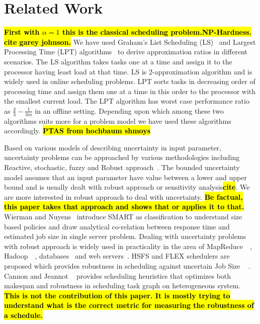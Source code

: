 \documentclass[10pt, conference, compsocconf]{IEEEtran}
\newcommand{\todo}[1]{{\color{red}\textbf{\hl{#1}}\xspace}}
\begin{document}
\section{Related Work}\label{sec3}

\todo{First with $\alpha=1$ this is the classical scheduling
  problem.}\todo{NP-Hardness. cite garey johnson.} We have used
Graham's List Scheduling (LS)~\cite{Graham66} and Largest Processing
Time (LPT) algorithms~\cite{Graham69boundson} to derive approximation
ratios in different scenarios. The LS algorithm takes tasks one at a
time and assign it to the processor having least load at that time. LS
is 2-approximation algorithm and is widely used in online scheduling
problems. LPT sorts tasks in decreasing order of processing time and
assign them one at a time in this order to the processor with the
smallest current load. The LPT algorithm has worst case performance
ratio as $\frac{4}{3}-\frac{1}{3m} $ in an offline setting. Depending
upon which among these two algorithms suits more for a problem model
we have used these algorithms accordingly. \todo{PTAS from hochbaum shmoys}



Based on various models of describing uncertainty in input parameter,
uncertainty problems can be approached by various methodologies
including Reactive, stochastic, fuzzy and Robust
approach~\cite{DBLP:journals/cce/LiI08}. The bounded uncertainty model
assumes that an input parameter have value between a lower and upper
bound and is usually dealt with robust approach or sensitivity
analysis\todo{cite}. We are more interested in robust approach to deal
with uncertainty. \todo{ Be factual,
  this paper takes that approach and shows that or applies it to
  that.} Wierman and Nuyens~\cite{conf/sigmetrics/WiermanN08}
introduce SMART as classification to understand size based policies
and draw analytical co-relation between response time and estimated
job size in single server problem. Dealing with uncertainty problems
with robust approach is widely used in practicality in the area of
MapReduce~\cite{Kavulya:2010:ATP:1844765.1845224}~\cite{Verma:2011:AAR:1998582.1998637},
Hadoop~\cite{Wolf:2010:FSA:2023718.2023720}~\cite{White:2009:HDG:1717298},
databases~\cite{Lipton199518} and web
servers~\cite{Cardellini99dynamicload}. HSFS and FLEX schedulers are
proposed which provides robustness in scheduling against uncertain Job
Size ~\cite{Wolf:2010:FSA:2023718.2023720} \cite{6691554}. Cannon and
Jeannot ~\cite{cj09c} provides scheduling heuristics that optimizes
both makespan and robustness in scheduling task graph on heterogeneous
system. \todo{This is not the contribution of this paper. It is mostly
  trying to understand what is the correct metric for measuring the
  robustness of a schedule. }
\end{document}
